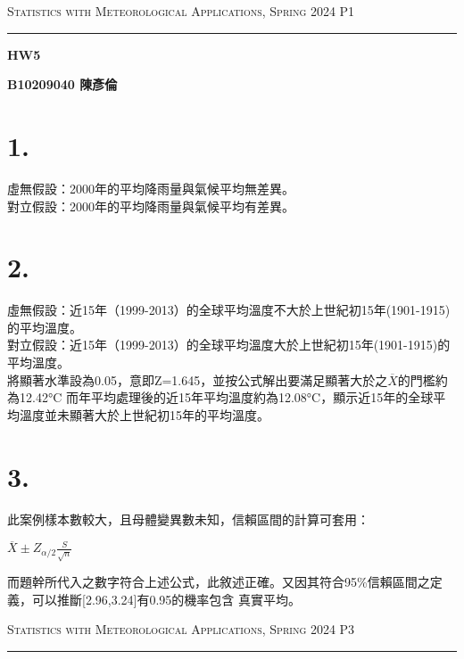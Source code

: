 \documentclass{article}
\author{B10209040 陳彥倫}
\begin{document}
\thispagestyle{empty}
\hfill {\scshape \large Statistics with Meteorological Applications, Spring 2024} \hfill {\scshape P1}
\smallskip
\hrule
\begin{CJK*}{UTF8}{bsmi}
\bigskip
\bigskip
\bigskip

\centerline{\huge \textbf {HW5}}
\bigskip
\centerline{\textbf {B10209040 陳彥倫}}


\section*{1.}
    \begin{spacing}{2.5}
        \begin{large}
            虛無假設：2000年的平均降雨量與氣候平均無差異。\\
            對立假設：2000年的平均降雨量與氣候平均有差異。
        \end{large}
    \end{spacing}

\section*{2.}
    \begin{spacing}{2.5}
        \begin{large}
            虛無假設：近15年（1999-2013）的全球平均溫度不大於上世紀初15年(1901-1915)的平均溫度。\\
            對立假設：近15年（1999-2013）的全球平均溫度大於上世紀初15年(1901-1915)的平均溫度。\\
            將顯著水準設為0.05，意即Z=1.645，並按公式解出要滿足顯著大於之$\overline{X}$的門檻約為12.42°C
            而年平均處理後的近15年平均溫度約為12.08°C，顯示近15年的全球平均溫度並未顯著大於上世紀初15年的平均溫度。
        \end{large}
    \end{spacing}

\section*{3.}
\begin{spacing}{2.5}
    \begin{large}
        此案例樣本數較大，且母體變異數未知，信賴區間的計算可套用：\\
        \begin{center}
            $\overline{X}\pm Z_{\alpha/2} \frac{S}{\sqrt{n}}$
        \end{center}
        而題幹所代入之數字符合上述公式，此敘述正確。又因其符合95\%信賴區間之定義，可以推斷[2.96,3.24]有0.95的機率包含
        真實平均。
    \end{large}
\end{spacing}
        
\newpage
\thispagestyle{empty}
\hfill {\scshape \large Statistics with Meteorological Applications, Spring 2024} \hfill {\scshape P3}
\smallskip
\hrule    
\bigskip
\bigskip
\bigskip

\end{CJK*}
\end{document}
